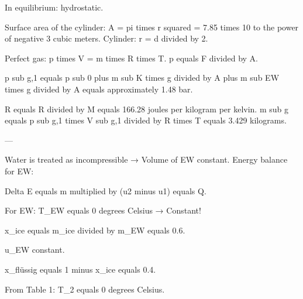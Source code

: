 In equilibrium: hydrostatic.  

Surface area of the cylinder: A = pi times r squared = 7.85 times 10 to the power of negative 3 cubic meters.  
Cylinder: r = d divided by 2.  

Perfect gas:  
p times V = m times R times T.  
p equals F divided by A.  

p sub g,1 equals p sub 0 plus m sub K times g divided by A plus m sub EW times g divided by A equals approximately 1.48 bar.  

R equals R divided by M equals 166.28 joules per kilogram per kelvin.  
m sub g equals p sub g,1 times V sub g,1 divided by R times T equals 3.429 kilograms.  

---

Water is treated as incompressible → Volume of EW constant.  
Energy balance for EW:  

Delta E equals m multiplied by (u2 minus u1) equals Q.  

For EW: T_EW equals 0 degrees Celsius → Constant!  

x_ice equals m_ice divided by m_EW equals 0.6.  

u_EW constant.  

x_flüssig equals 1 minus x_ice equals 0.4.  

From Table 1: T_2 equals 0 degrees Celsius.